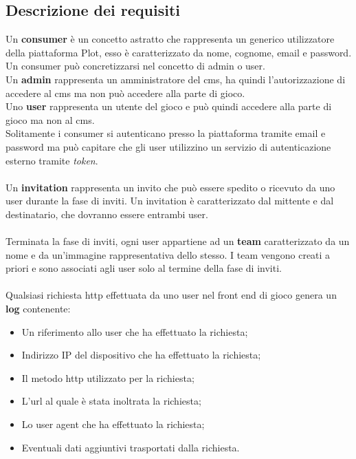 \subsection{Descrizione dei requisiti}
Un \textbf{consumer} è un concetto astratto che rappresenta un generico utilizzatore della piattaforma Plot, esso è caratterizzato da nome, cognome, email e password.
Un consumer può concretizzarsi nel concetto di admin o user. \\
Un \textbf{admin} rappresenta un amministratore del \gls{cms}\glsfirstoccur{}, ha quindi l'autorizzazione di accedere al \gls{cms}\glsfirstoccur{} ma non può accedere alla parte di gioco. \\ 
Uno \textbf{user} rappresenta un utente del gioco e può quindi accedere alla parte di gioco ma non al \gls{cms}\glsfirstoccur{}. \\
Solitamente i consumer si autenticano presso la piattaforma tramite email e password ma può capitare che gli user utilizzino un servizio di autenticazione esterno tramite \textit{token}.
\\ \\
Un \textbf{invitation} rappresenta un invito che può essere spedito o ricevuto da uno user durante la fase di inviti. Un invitation è caratterizzato dal mittente e dal destinatario, che dovranno essere entrambi user.
\\ \\
Terminata la fase di inviti, ogni user appartiene ad un \textbf{team} caratterizzato da un nome e da un'immagine rappresentativa dello stesso. I team vengono creati a priori e sono associati agli user solo al termine della fase di inviti. 
\\ \\
Qualsiasi richiesta \gls{http}\glsfirstoccur{} effettuata da uno user nel front end di gioco genera un \textbf{log} contenente:
\begin{itemize}
	\item Un riferimento allo user che ha effettuato la richiesta;
	\item Indirizzo IP del dispositivo che ha effettuato la richiesta;
	\item Il metodo \gls{http}\glsfirstoccur{} utilizzato per la richiesta;
	\item L'\gls{url}\glsfirstoccur{} al quale è stata inoltrata la richiesta;
	\item Lo user agent che ha effettuato la richiesta;
	\item Eventuali dati aggiuntivi trasportati dalla richiesta.
\end{itemize}  

